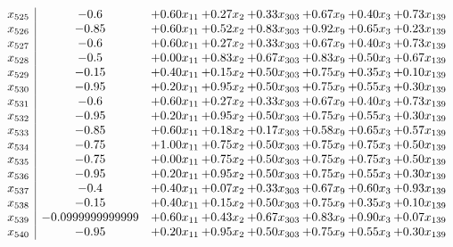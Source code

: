 \documentclass[8pt]{article}
\begin{document}
\[\begin{array}{c| c c@{\hskip 2pt} c@{\hskip 2pt} c@{\hskip 2pt} c@{\hskip 2pt} c@{\hskip 2pt} c@{\hskip 2pt} }
 x_{525}   &  -0.6 & +  0.60 x_{11} & +  0.27 x_{2} & +  0.33 x_{303} & +  0.67 x_{9} & +  0.40 x_{3} & +  0.73 x_{139}\\
 x_{526}   &  -0.85 & +  0.60 x_{11} & +  0.52 x_{2} & +  0.83 x_{303} & +  0.92 x_{9} & +  0.65 x_{3} & +  0.23 x_{139}\\
 x_{527}   &  -0.6 & +  0.60 x_{11} & +  0.27 x_{2} & +  0.33 x_{303} & +  0.67 x_{9} & +  0.40 x_{3} & +  0.73 x_{139}\\
 x_{528}   &  -0.5 & +  0.00 x_{11} & +  0.83 x_{2} & +  0.67 x_{303} & +  0.83 x_{9} & +  0.50 x_{3} & +  0.67 x_{139}\\
 x_{529}   &  -0.15 & +  0.40 x_{11} & +  0.15 x_{2} & +  0.50 x_{303} & +  0.75 x_{9} & +  0.35 x_{3} & +  0.10 x_{139}\\
 x_{530}   &  -0.95 & +  0.20 x_{11} & +  0.95 x_{2} & +  0.50 x_{303} & +  0.75 x_{9} & +  0.55 x_{3} & +  0.30 x_{139}\\
 x_{531}   &  -0.6 & +  0.60 x_{11} & +  0.27 x_{2} & +  0.33 x_{303} & +  0.67 x_{9} & +  0.40 x_{3} & +  0.73 x_{139}\\
 x_{532}   &  -0.95 & +  0.20 x_{11} & +  0.95 x_{2} & +  0.50 x_{303} & +  0.75 x_{9} & +  0.55 x_{3} & +  0.30 x_{139}\\
 x_{533}   &  -0.85 & +  0.60 x_{11} & +  0.18 x_{2} & +  0.17 x_{303} & +  0.58 x_{9} & +  0.65 x_{3} & +  0.57 x_{139}\\
 x_{534}   &  -0.75 & +  1.00 x_{11} & +  0.75 x_{2} & +  0.50 x_{303} & +  0.75 x_{9} & +  0.75 x_{3} & +  0.50 x_{139}\\
 x_{535}   &  -0.75 & +  0.00 x_{11} & +  0.75 x_{2} & +  0.50 x_{303} & +  0.75 x_{9} & +  0.75 x_{3} & +  0.50 x_{139}\\
 x_{536}   &  -0.95 & +  0.20 x_{11} & +  0.95 x_{2} & +  0.50 x_{303} & +  0.75 x_{9} & +  0.55 x_{3} & +  0.30 x_{139}\\
 x_{537}   &  -0.4 & +  0.40 x_{11} & +  0.07 x_{2} & +  0.33 x_{303} & +  0.67 x_{9} & +  0.60 x_{3} & +  0.93 x_{139}\\
 x_{538}   &  -0.15 & +  0.40 x_{11} & +  0.15 x_{2} & +  0.50 x_{303} & +  0.75 x_{9} & +  0.35 x_{3} & +  0.10 x_{139}\\
 x_{539}   &  -0.0999999999999 & +  0.60 x_{11} & +  0.43 x_{2} & +  0.67 x_{303} & +  0.83 x_{9} & +  0.90 x_{3} & +  0.07 x_{139}\\
 x_{540}   &  -0.95 & +  0.20 x_{11} & +  0.95 x_{2} & +  0.50 x_{303} & +  0.75 x_{9} & +  0.55 x_{3} & +  0.30 x_{139}\\

\end{array}\]
\end{document}
